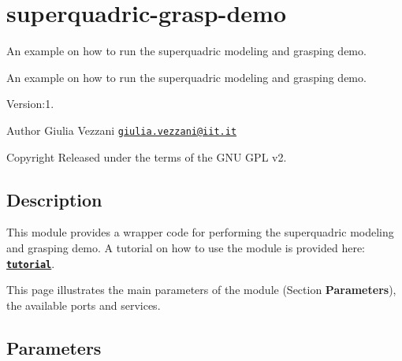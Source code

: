 \section{superquadric-\/grasp-\/demo}
\label{group__superquadric-grasp-demo}


An example on how to run the superquadric modeling and grasping demo.  


An example on how to run the superquadric modeling and grasping demo. 

Version\+:1. \begin{DoxyAuthor}{Author}
Giulia Vezzani \href{mailto:giulia.vezzani@iit.it}{\tt giulia.\+vezzani@iit.\+it} ~\newline
 
\end{DoxyAuthor}
\begin{DoxyCopyright}{Copyright}
Released under the terms of the G\+NU G\+PL v2. 
\end{DoxyCopyright}
\hypertarget{group__superquadric-grasp-demo_intro_sec}{}\subsection{Description}\label{group__superquadric-grasp-demo_intro_sec}
This module provides a wrapper code for performing the superquadric modeling and grasping demo. A tutorial on how to use the module is provided here\+: \href{https://github.com/robotology/superquadric-grasp-example/tree/gh-pages/grasp-demo#how-to-run-the-code}{\tt {\bfseries tutorial}}.

This page illustrates the main parameters of the module (Section {\bfseries Parameters}), the available ports and services.\hypertarget{group__superquadric-grasp-demo_parameters_sec}{}\subsection{Parameters}\label{group__superquadric-grasp-demo_parameters_sec}

